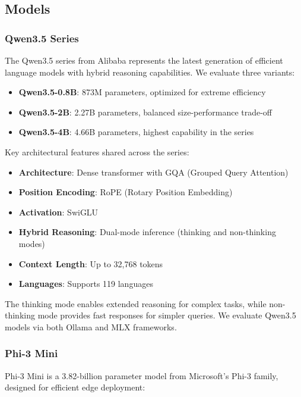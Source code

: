 \documentclass[11pt,a4paper]{article}
\begin{document}
\subsection{Models}

\subsubsection{Qwen3.5 Series}

The Qwen3.5 series \cite{qwen2025technical} from Alibaba represents the latest generation of efficient language models with hybrid reasoning capabilities. We evaluate three variants:

\begin{itemize}[leftmargin=*,nosep]
    \item \textbf{Qwen3.5-0.8B}: 873M parameters, optimized for extreme efficiency
    \item \textbf{Qwen3.5-2B}: 2.27B parameters, balanced size-performance trade-off
    \item \textbf{Qwen3.5-4B}: 4.66B parameters, highest capability in the series
\end{itemize}

Key architectural features shared across the series:
\begin{itemize}[leftmargin=*,nosep]
    \item \textbf{Architecture}: Dense transformer with GQA (Grouped Query Attention)
    \item \textbf{Position Encoding}: RoPE (Rotary Position Embedding)
    \item \textbf{Activation}: SwiGLU
    \item \textbf{Hybrid Reasoning}: Dual-mode inference (thinking and non-thinking modes)
    \item \textbf{Context Length}: Up to 32,768 tokens
    \item \textbf{Languages}: Supports 119 languages
\end{itemize}

The thinking mode enables extended reasoning for complex tasks, while non-thinking mode provides fast responses for simpler queries. We evaluate Qwen3.5 models via both Ollama and MLX frameworks.

\subsubsection{Phi-3 Mini}

Phi-3 Mini \cite{abdin2024phi3} is a 3.82-billion parameter model from Microsoft's Phi-3 family, designed for efficient edge deployment:
\end{document}
